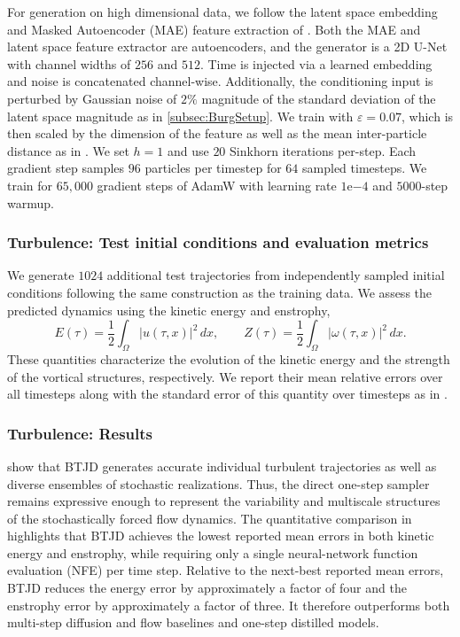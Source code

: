 \documentclass[oneside,11pt]{article}
\theoremstyle{remark}
\begin{document}
For generation on high dimensional data, we follow the latent space embedding and Masked Autoencoder (MAE) feature extraction of \cite{deng2026drifting,han2026wflow}. Both the MAE and latent space feature extractor are autoencoders, and the generator is a 2D U-Net with channel widths of $256$ and $512$. Time is  injected via a learned embedding and noise is concatenated channel-wise. Additionally, the conditioning input is perturbed by Gaussian noise of $2\%$ magnitude of the standard deviation of the latent space  magnitude as in \ref{subsec:BurgSetup}. We train with $\varepsilon = 0.07$, which is then scaled by the dimension of the feature as well as the mean inter-particle distance as in \cite{deng2026drifting}. We set $h=1$ and use $20$ Sinkhorn iterations per-step. Each gradient step samples $96$ particles per timestep for $64$ sampled timesteps. We train for $65,000$ gradient steps of AdamW with learning rate $1\mathrm{e}{-4}$ and $5000$-step warmup.

\subsubsection{Turbulence: Test initial conditions and evaluation metrics}
We generate $1024$ additional test trajectories from independently sampled initial conditions following the same construction as the training data.
We assess the predicted dynamics using the kinetic energy and enstrophy,
    \begin{equation}\label{eq:NSEnergyEnstrophy}
        E(\tau)
        =
        \frac{1}{2}\int_\Omega |u(\tau,x)|^2\,dx,
        \qquad
        Z(\tau)
        =
        \frac{1}{2}\int_\Omega |\omega(\tau,x)|^2\,dx.
    \end{equation}
    These quantities characterize the evolution of the kinetic energy and the strength of the vortical structures, respectively. We report their mean relative errors over all timesteps along with the standard error of this quantity over timesteps as in .



\subsubsection{Turbulence: Results}
 show that BTJD generates accurate individual turbulent trajectories as well as diverse ensembles of stochastic  realizations. Thus, the direct one-step sampler remains expressive enough to represent the variability and multiscale structures of the stochastically forced flow dynamics.
The quantitative comparison in  highlights that BTJD achieves the lowest reported mean errors in both kinetic energy and enstrophy, while requiring only a single neural-network function evaluation (NFE) per time step. Relative to the next-best reported mean errors, BTJD reduces the energy error by approximately a factor of four and the enstrophy error by approximately a factor of three. It therefore outperforms both multi-step diffusion and flow baselines and one-step distilled models.
\end{document}
